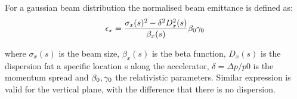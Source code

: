 \vspace*{-1mm}

For a gaussian beam distribution the normalised beam emittance is defined as:
\begin{equation}\label{eq:emit_from_beam_size}
    \epsilon_{x} = \frac{\sigma_x(s)^2 - \delta^2 D_x^2(s)}{\beta_x(s)} {\beta_0} {\gamma_0}
\end{equation}

where $\sigma_x(s)$ is the beam size, $\beta_x(s)$ is the beta function, $D_x(s)$ is the dispersion fat a specific location s along the accelerator, $\delta=\Delta p/p0$ is the momentum spread and ${\beta_0}, {\gamma_0}$ the relativistic parameters. Similar expression is valid for the vertical plane, with the difference that there is no dispersion.
